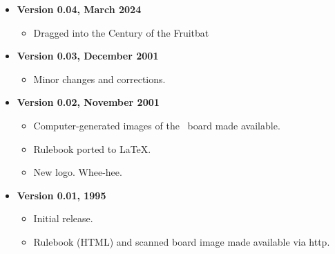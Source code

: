 %

\begin{itemize}
\item {\bf Version 0.04, March 2024}
  \begin{itemize}
  \item Dragged into the Century of the Fruitbat
  \end{itemize}

\item {\bf Version 0.03, December 2001}
  \begin{itemize}
  \item Minor changes and corrections.
  \end{itemize}

\item {\bf Version 0.02, November 2001}
  \begin{itemize}
  \item Computer-generated images of the \know\ board made available.
  \item Rulebook ported to \LaTeX.
  \item New logo.  Whee-hee.
  \end{itemize}
  
\item {\bf Version 0.01, 1995}
  \begin{itemize}
  \item Initial release.
  \item Rulebook (HTML) and scanned board image made available via http.
  \end{itemize}
\end{itemize}

%
